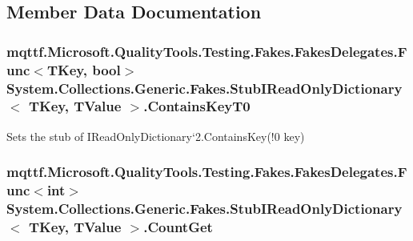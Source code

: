 \subsection{Member Data Documentation}
\hypertarget{class_system_1_1_collections_1_1_generic_1_1_fakes_1_1_stub_i_read_only_dictionary_3_01_t_key_00_01_t_value_01_4_a3d98eb2bbd985fd30cef12afe4d91a69}{
\subsubsection[{Contains\-Key\-T0}]{\setlength{\rightskip}{0pt plus 5cm}mqttf.\-Microsoft.\-Quality\-Tools.\-Testing.\-Fakes.\-Fakes\-Delegates.\-Func$<$T\-Key, bool$>$ System.\-Collections.\-Generic.\-Fakes.\-Stub\-I\-Read\-Only\-Dictionary$<$ T\-Key, T\-Value $>$.Contains\-Key\-T0}}\label{class_system_1_1_collections_1_1_generic_1_1_fakes_1_1_stub_i_read_only_dictionary_3_01_t_key_00_01_t_value_01_4_a3d98eb2bbd985fd30cef12afe4d91a69}


Sets the stub of I\-Read\-Only\-Dictionary`2.Contains\-Key(!0 key)

\hypertarget{class_system_1_1_collections_1_1_generic_1_1_fakes_1_1_stub_i_read_only_dictionary_3_01_t_key_00_01_t_value_01_4_a24560115984fe1e07c4f67312b62cdb5}{
\subsubsection[{Count\-Get}]{\setlength{\rightskip}{0pt plus 5cm}mqttf.\-Microsoft.\-Quality\-Tools.\-Testing.\-Fakes.\-Fakes\-Delegates.\-Func$<$int$>$ System.\-Collections.\-Generic.\-Fakes.\-Stub\-I\-Read\-Only\-Dictionary$<$ T\-Key, T\-Value $>$.Count\-Get}}\label{class_system_1_1_collections_1_1_generic_1_1_fakes_1_1_stub_i_read_only_dictionary_3_01_t_key_00_01_t_value_01_4_a24560115984fe1e07c4f67312b62cdb5}


